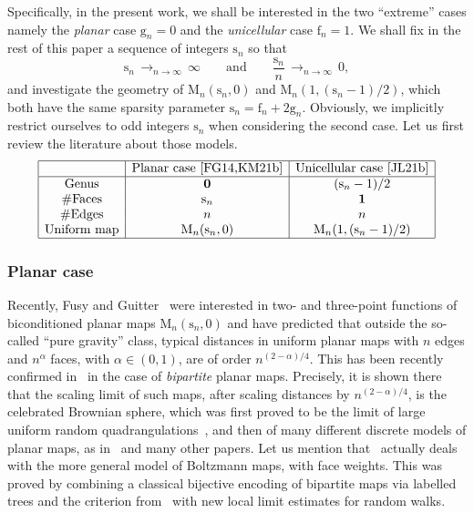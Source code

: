 \documentclass[11pt]{article}
\theoremstyle{plain}
\theoremstyle{definition}
\theoremstyle{remark}
\newcommand{\Map}{\mathrm{M}}
\newcommand{\face}{\mathrm{f}}
\newcommand{\gen}{\mathrm{g}}
\newcommand{\spar}{\mathrm{s}}
\newcommand{\cv}[1][n]{\,\mathop{\longrightarrow}^{}_{#1 \to \infty}\,}
\begin{document}
Specifically, in the present work, we shall be interested in the two ``extreme'' cases namely the \emph{planar} case $ \gen_n=0$ and the \emph{unicellular} case $ \face_n = 1$. We shall fix in the rest of this paper a sequence of integers $\spar_n$ so that
\begin{equation}\label{eq:standing}
\spar_n \cv \infty \qquad \text{and} \qquad \frac{\spar_n}{n} \cv 0,
\end{equation}
and investigate the geometry of $ \Map_n{(\spar_n,0)}$ and $ \Map_n{(1, (\spar_n-1)/2)}$, which both have the same sparsity parameter $\spar_n = \face_n + 2 \gen_n$.
Obviously, we implicitly restrict ourselves to odd integers $\spar_n$ when considering the second case.
Let us first review the literature about those models.
\[
\begin{array}{|c|c|c|}
\hline
& \mbox{Planar case~\cite{FG14,KM21b}} & \mbox{Unicellular case~\cite{JL21b}} \\
\hline
\mbox{Genus} & \mathbf{0} & (\spar_n-1)/2 \\
\#\mbox{Faces} & \spar_n & \mathbf{1} \\
\#\mbox{Edges} & n & n \\
\mbox{Uniform map} & \Map_n(\spar_n,0) & \displaystyle \Map_n(1, (\spar_n-1)/2)\\
\hline
\end{array}
\]

\subsubsection*{Planar case} Recently, Fusy and Guitter~\cite{FG14} were interested in two- and three-point functions of biconditioned planar maps $ \Map_n(\spar_n,0)$ and have predicted that outside the so-called ``pure gravity'' class, typical distances in uniform planar maps with $n$ edges and $n^\alpha$ faces, with $\alpha \in (0,1)$, are of order $n^{(2-\alpha)/4}$. This has been recently confirmed in~\cite{KM21b} in the case of \emph{bipartite} planar maps.
Precisely, it is shown there that the scaling limit of such maps, after scaling distances by $n^{(2- \alpha)/4}$, is the celebrated Brownian sphere, which was first proved to be the limit of large uniform random quadrangulations~\cite{LG13, Mie13}, and then of many different discrete models of planar maps, as in~\cite{ABA21,BJM14,NR18,CLG19,Mar22}
and many other papers. Let us mention that~\cite{KM21b} actually deals with the more general model of Boltzmann maps, with face weights. This was proved by combining a classical bijective encoding of bipartite maps via labelled trees and the criterion from~\cite{Mar22} with new local limit estimates for random walks.
\end{document}
